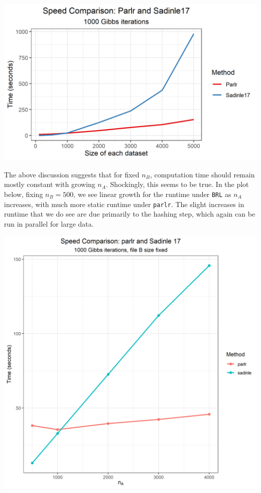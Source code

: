 \documentclass[
  12pt,
]{article}
\begin{document}
\begin{center}\includegraphics[width=23.6in]{../notes/figures/sadinle_speed_plot} \end{center}

The above discussion suggests that for fixed \(n_B\), computation time
should remain mostly constant with growing \(n_A\). Shockingly, this
seems to be true. In the plot below, fixing \(n_B = 500\), we see linear
growth for the runtime under \texttt{BRL} as \(n_A\) increases, with
much more static runtime under \texttt{parlr}. The slight increases in
runtime that we do see are due primarily to the hashing step, which
again can be run in parallel for large data.

\begin{center}\includegraphics[width=29.17in]{../notes/figures/speed_plot_fixed_nB} \end{center}
\end{document}
